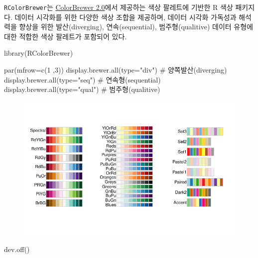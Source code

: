 \documentclass[
  letterpaper,
]{book}
\newenvironment{Shaded}{\begin{snugshade}}{\end{snugshade}}
\newcommand{\AttributeTok}[1]{\textcolor[rgb]{0.40,0.45,0.13}{#1}}
\newcommand{\CommentTok}[1]{\textcolor[rgb]{0.37,0.37,0.37}{#1}}
\newcommand{\DecValTok}[1]{\textcolor[rgb]{0.68,0.00,0.00}{#1}}
\newcommand{\FunctionTok}[1]{\textcolor[rgb]{0.28,0.35,0.67}{#1}}
\newcommand{\NormalTok}[1]{\textcolor[rgb]{0.00,0.23,0.31}{#1}}
\newcommand{\StringTok}[1]{\textcolor[rgb]{0.13,0.47,0.30}{#1}}
\begin{document}
\texttt{RColorBrewer}는 \href{https://colorbrewer2.org/}{ColorBrewer
2.0}에서 제공하는 색상 팔레트에 기반한 R 색상 패키지다. 데이터 시각화를
위한 다양한 색상 조합을 제공하며, 데이터 시각화 가독성과 해석력을 향상을
위한 발산(diverging), 연속(sequential), 범주형(qualitive) 데이터 유형에
대한 적합한 색상 팔레트가 포함되어 있다.

\begin{Shaded}
\begin{Highlighting}[]
\FunctionTok{library}\NormalTok{(RColorBrewer)}

\FunctionTok{par}\NormalTok{(}\AttributeTok{mfrow=}\FunctionTok{c}\NormalTok{(}\DecValTok{1}\NormalTok{ ,}\DecValTok{3}\NormalTok{))}
\FunctionTok{display.brewer.all}\NormalTok{(}\AttributeTok{type=}\StringTok{"div"}\NormalTok{)  }\CommentTok{\# 양쪽발산(diverging)}
\FunctionTok{display.brewer.all}\NormalTok{(}\AttributeTok{type=}\StringTok{"seq"}\NormalTok{)  }\CommentTok{\# 연속형(sequential)}
\FunctionTok{display.brewer.all}\NormalTok{(}\AttributeTok{type=}\StringTok{"qual"}\NormalTok{) }\CommentTok{\# 범주형(qualitive)}
\end{Highlighting}
\end{Shaded}

\begin{figure}[H]

{\centering \includegraphics{colors_files/figure-pdf/unnamed-chunk-2-1.pdf}

}

\end{figure}

\begin{Shaded}
\begin{Highlighting}[]
\FunctionTok{dev.off}\NormalTok{()}
\end{Highlighting}
\end{Shaded}
\end{document}
